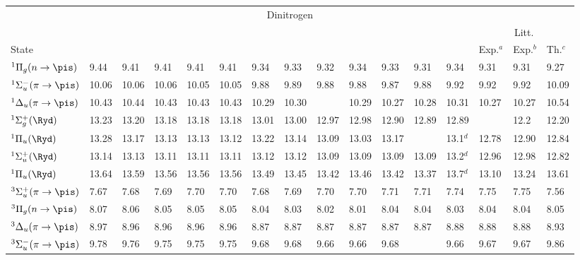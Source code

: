 \begin{tabular}{l|p{.6cm}p{1.1cm}p{1.4cm}p{1.7cm}p{.9cm}|p{.6cm}p{1.1cm}p{1.4cm}p{.9cm}|p{.6cm}p{1.1cm}p{.9cm}|p{.7cm}p{.7cm}p{.7cm}}
		 \multicolumn{16}{c}{Dinitrogen}\\
		& \multicolumn{5}{c}{\AVDZ} & \multicolumn{4}{c}{\AVTZ}& \multicolumn{3}{c}{\AVQZ} & \multicolumn{3}{c}{Litt.}\\
State 	& {\CC{3}} & {\CCSDT} & {\CCSDTQ} & {\CCSDTQP} & {\exCI} & {\CC{3}} & {\CCSDT} & {\CCSDTQ}  & {\exCI}& {\CC{3}} & {\CCSDT}   & {\exCI} & Exp.$^a$ &  Exp.$^b$ & Th.$^c$\\
$^1\Pi_g (n \rightarrow \pis)$ 				&9.44	&9.41  &	9.41	&9.41 &	9.41		&9.34 &9.33 	&9.32	&9.34	&9.33 	&9.31	&9.34	&9.31	&9.31	&9.27	\\
$^1\Sigma_u^- (\pi \rightarrow \pis)$			&10.06	&10.06&	10.06&10.05&	10.05	&9.88 &9.89 	&9.88	&9.88	&9.87 	&9.88	&9.92	&9.92	&9.92	&10.09	\\
$^1\Delta_u (\pi \rightarrow \pis)$ 			&10.43	&10.44&	10.43&10.43&	10.43	&10.29&10.30 	&		&10.29	&10.27 	&10.28	&10.31	&10.27	&10.27	&10.54	\\
$^1\Sigma_g^+ (\Ryd)$ 					&13.23	&13.20&	13.18&13.18&	13.18	&13.01&13.00	&12.97	&12.98	&12.90 	&12.89	&12.89	&		&12.2	&12.20	\\
$^1\Pi_u (\Ryd)$ 						&13.28	&13.17&	13.13&13.13&	13.12	&13.22&13.14	&13.09	&13.03	&13.17 	&		&13.1$^d$&12.78	&12.90	&12.84	\\
$^1\Sigma_u^+ (\Ryd)$ 					&13.14	&13.13&	13.11&13.11&	13.11	&13.12&13.12	&13.09	&13.09	&13.09 	&13.09	&13.2$^d$&12.96	&12.98	&12.82	\\
$^1\Pi_u (\Ryd)$ 						&13.64	&13.59&	13.56&13.56&	13.56	&13.49&13.45	&13.42	&13.46	&13.42 	&13.37	&13.7$^d$&13.10	&13.24	&13.61	\\
$^3\Sigma_u^+ (\pi \rightarrow \pis)$			&7.67	&7.68&	7.69	&7.70 &	7.70		&7.68 &7.69	&7.70	&7.70	&7.71 	&7.71	&7.74	&7.75	&7.75	&7.56	\\
$^3\Pi_g (n \rightarrow \pis)$ 				&8.07	&8.06&	8.05 &8.05 &	8.05		&8.04 &8.03	&8.02	&8.01	&8.04 	&8.04	&8.03	&8.04	&8.04	&8.05	\\
$^3\Delta_u (\pi \rightarrow \pis)$ 			&8.97	&8.96&	8.96 &8.96 &	8.96		&8.87 &8.87	&8.87	&8.87	&8.87 	&8.87	&8.88	&8.88	&8.88	&8.93	\\
$^3\Sigma_u^- (\pi \rightarrow \pis)$			&9.78	&9.76&	9.75 &9.75&	9.75		&9.68 &9.68	&9.66	&9.66	&9.68 	&		&9.66	&9.67	&9.67	&9.86	\\
 \end{tabular}